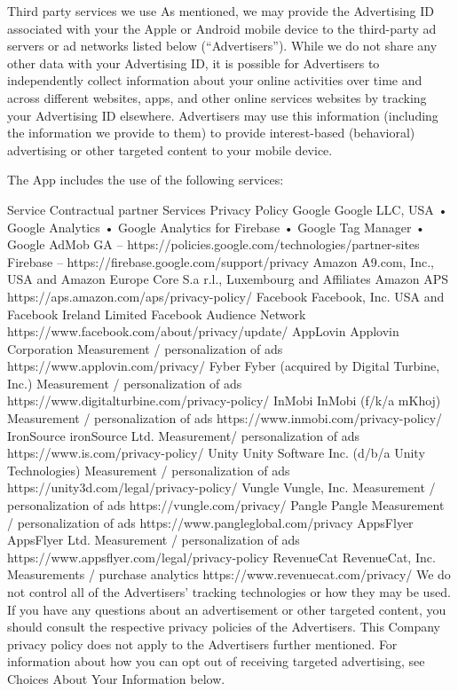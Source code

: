 Third party services we use 
As mentioned, we may provide the Advertising ID associated with your the Apple or Android mobile device to the third-party ad servers or ad networks listed below (“Advertisers”). While we do not share any other data with your Advertising ID, it is possible for Advertisers to independently collect information about your online activities over time and across different websites, apps, and other online services websites by tracking your Advertising ID elsewhere. Advertisers may use this information (including the information we provide to them) to provide interest-based (behavioral) advertising or other targeted content to your mobile device.

The App includes the use of the following services:

 Service	 Contractual partner	Services	 Privacy Policy
 Google	Google LLC, USA	• Google Analytics
• Google Analytics for Firebase
• Google Tag Manager
• Google AdMob	GA – https://policies.google.com/technologies/partner-sites
Firebase – https://firebase.google.com/support/privacy 
 Amazon	A9.com, Inc., USA and Amazon Europe Core S.a r.l., Luxembourg and Affiliates	Amazon APS	https://aps.amazon.com/aps/privacy-policy/
 Facebook	Facebook, Inc. USA and Facebook Ireland Limited	Facebook Audience Network	https://www.facebook.com/about/privacy/update/
 AppLovin	Applovin Corporation	Measurement / personalization of ads	https://www.applovin.com/privacy/ 
 Fyber	Fyber (acquired by Digital Turbine, Inc.)	Measurement / personalization of ads	https://www.digitalturbine.com/privacy-policy/
 InMobi	InMobi (f/k/a mKhoj)	Measurement / personalization of ads	https://www.inmobi.com/privacy-policy/ 
 IronSource	ironSource Ltd.	Measurement/ personalization of ads 	https://www.is.com/privacy-policy/ 
 Unity	Unity Software Inc. (d/b/a Unity Technologies)	Measurement / personalization of ads	https://unity3d.com/legal/privacy-policy/
 Vungle	Vungle, Inc.	Measurement / personalization of ads	https://vungle.com/privacy/
 Pangle	Pangle	Measurement / personalization of ads	https://www.pangleglobal.com/privacy
 AppsFlyer	AppsFlyer Ltd.	Measurement / personalization of ads	https://www.appsflyer.com/legal/privacy-policy
 RevenueCat	RevenueCat, Inc.	Measurements / purchase analytics	https://www.revenuecat.com/privacy/
We do not control all of the Advertisers’ tracking technologies or how they may be used. If you have any questions about an advertisement or other targeted content, you should consult the respective privacy policies of the Advertisers. This Company privacy policy does not apply to the Advertisers further mentioned. For information about how you can opt out of receiving targeted advertising, see Choices About Your Information below.

